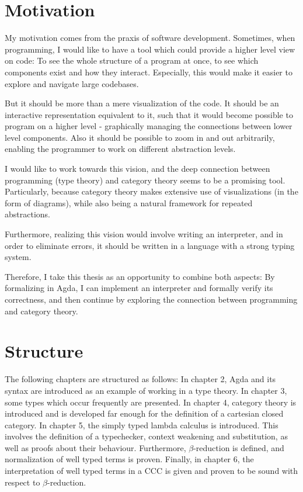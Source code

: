 \section*{Motivation}
My motivation comes from the praxis of software development. Sometimes, when
programming, I would like to have a tool which could provide a higher level
view on code: To see the whole
structure of a program at once, to see which components exist and how they
interact. Especially, this would make it easier to explore and navigate large codebases.

But it should be more than a mere visualization of the code. It should be an
interactive representation equivalent to it, such that it would
become possible to program on a higher level - graphically managing the
connections between lower level components. Also it should be possible to zoom
in and out arbitrarily, enabling the programmer to work on different abstraction
levels.

\medskip

I would like to work towards this vision, and the deep connection between
programming (type theory) and category theory seems to be a promising tool.
Particularly, because category theory makes extensive use of visualizations (in
the form of diagrams), while also being a natural framework for repeated
abstractions.

Furthermore, realizing this vision would involve writing an interpreter, and in
order to eliminate errors, it should be written in a language with a strong typing
system. 

\medskip

Therefore, I take this thesis as an opportunity to combine both aspects: By
formalizing in Agda, I can implement an interpreter and formally verify its
correctness, and then continue by exploring the connection between programming
and category theory.


\section*{Structure}
The following chapters are structured as follows: In chapter 2, Agda and its
syntax are introduced as an example of working in a type theory. In chapter 3,
some types which occur frequently are presented. In chapter 4, category theory
is introduced and is developed far enough for the definition of a cartesian
closed category. In chapter 5, the simply typed lambda calculus is introduced.
This involves the definition of a typechecker, context weakening and
substitution, as well as proofs about their behaviour. Furthermore,
$β$-reduction is defined, and normalization of well typed terms is proven.
Finally, in chapter 6, the interpretation of well typed terms in a CCC is given
and proven to be sound with respect to $β$-reduction.













